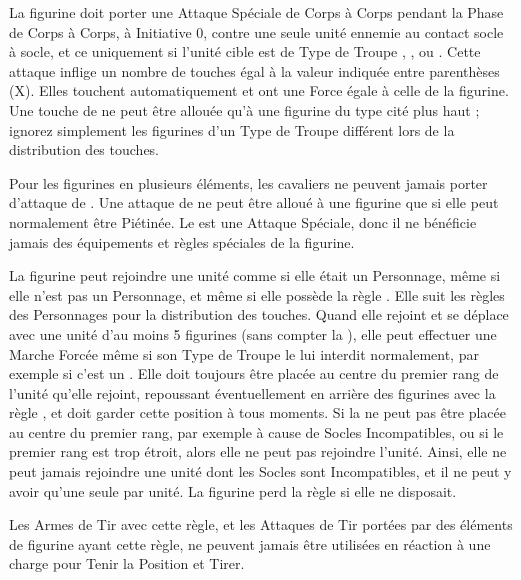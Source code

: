 
La figurine doit porter une Attaque Spéciale de Corps à Corps pendant la Phase de Corps à Corps, à Initiative 0, contre une seule unité ennemie au contact socle à socle, et ce uniquement si l'unité cible est de Type de Troupe \infantry{}, \warbeast{}, \swarm{} ou \newfromWHB{\warmachine}. Cette attaque inflige un nombre de touches égal à la valeur indiquée entre parenthèses (X). Elles touchent automatiquement et ont une Force égale à celle de la figurine. Une touche de \stomp{} ne peut être allouée qu'à une figurine du type cité plus haut ; ignorez simplement les figurines d'un Type de Troupe différent lors de la distribution des touches.

Pour les figurines en plusieurs éléments, les cavaliers ne peuvent jamais porter d'attaque de \stomp{}. Une attaque de \stomp{} ne peut être alloué à une figurine que si elle peut normalement être Piétinée. Le \stomp{} est une Attaque Spéciale, donc il ne bénéficie jamais des équipements et règles spéciales de la figurine.


La figurine peut rejoindre une unité comme si elle était un Personnage, même si elle n'est pas un Personnage, et même si elle possède la règle \largetarget{}. Elle suit les règles des Personnages pour la distribution des touches. Quand elle rejoint et se déplace avec une unité d'au moins 5 figurines (sans compter la \warplatform{}), elle peut effectuer une Marche Forcée même si son Type de Troupe le lui interdit normalement, par exemple si c'est un \chariot{}. Elle doit toujours être placée au centre du premier rang de l'unité qu'elle rejoint, repoussant éventuellement en arrière des figurines avec la règle \frontrank{}, et doit garder cette position à tous moments. Si la \warplatform{} ne peut pas être placée au centre du premier rang, par exemple à cause de Socles Incompatibles, ou si le premier rang est trop étroit, alors elle ne peut pas rejoindre l'unité. Ainsi, elle ne peut jamais rejoindre une unité dont les Socles sont Incompatibles, et il ne peut y avoir qu'une seule \warplatform{} par unité. La figurine perd la règle \swiftstride{} si elle ne disposait.


Les Armes de Tir avec cette règle, et les Attaques de Tir portées par des éléments de figurine ayant cette règle, ne peuvent jamais être utilisées en réaction à une charge pour Tenir la Position et Tirer.

